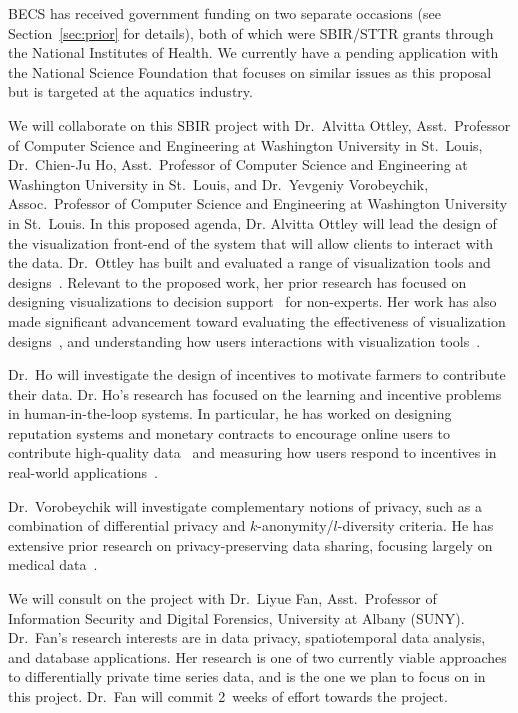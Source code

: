 BECS has received government funding on two separate occasions
(see Section~\ref{sec:prior} for details), both of which were SBIR/STTR
grants through the National Institutes of Health.  We currently
have a pending application with the National Science Foundation
that focuses on similar issues as this proposal but is targeted at
the aquatics industry.

We will collaborate on this SBIR project with Dr.~Alvitta Ottley,
Asst.~Professor of Computer Science and Engineering at Washington University
in St.~Louis, Dr.~Chien-Ju Ho, 
Asst.~Professor of Computer Science and Engineering at Washington University
in St.~Louis, and Dr.~Yevgeniy Vorobeychik, Assoc.~Professor of Computer Science and Engineering at Washington University
in St.~Louis.
In this proposed agenda, Dr. Alvitta Ottley will lead the design
of the visualization front-end of the system that will allow clients
to interact with the data.
Dr.~Ottley has built and evaluated a range of visualization tools
and designs~\cite{brown2014finding, hakone2017proact,ottley2015personality,peck2013using}. 
Relevant to the proposed work, her prior research has focused on designing visualizations to decision support~\cite{hakone2017proact,ottley2012visually,ottley2016improving} for non-experts. 
Her work has also made significant advancement toward evaluating the effectiveness of visualization designs~\cite{peck2013using,ziemkiewicz2013visualization}, and understanding how users interactions with visualization tools~\cite{brown2014finding,ottley2015personality}.  

Dr.~Ho will investigate the design of incentives to motivate farmers to
contribute their data. Dr. Ho's research has focused on the learning and incentive
problems in human-in-the-loop systems. In particular, he has worked on designing
reputation systems and monetary contracts to encourage online users
to contribute high-quality data~\cite{HSV14,HZVS12}
and measuring how users respond to incentives in 
real-world applications~\cite{hssv15}.

Dr.~Vorobeychik will investigate complementary notions of privacy,
such as a combination of differential privacy and
$k$-anonymity/$l$-diversity criteria.
He has extensive prior research on privacy-preserving data sharing,
focusing largely on medical data~\cite{Li17,Wan15,Wan17,Xia15}.


We will consult on the project with Dr.~Liyue Fan, Asst.~Professor
of Information Security and Digital Forensics, University at Albany (SUNY).
Dr.~Fan's research interests are in data privacy, spatiotemporal data
analysis, and database applications.  Her research is one of two
currently viable approaches to differentially private time series data,
and is the one we plan to focus on in this project.
Dr.~Fan will commit 2~weeks of effort towards the project.

